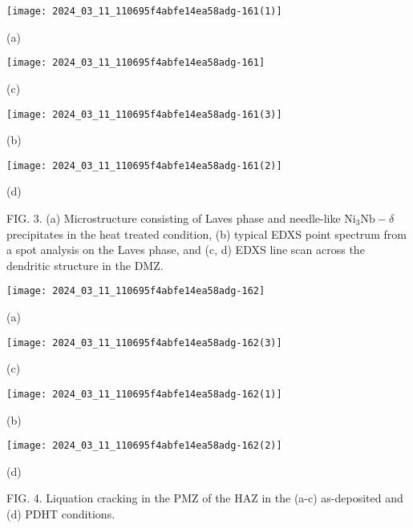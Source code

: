 \documentclass[10pt]{article}
\begin{document}
\begin{center}
\texttt{[image: 2024\_03\_11\_110695f4abfe14ea58adg-161(1)]}
\end{center}

(a)

\begin{center}
\texttt{[image: 2024\_03\_11\_110695f4abfe14ea58adg-161]}
\end{center}

(c)

\begin{center}
\texttt{[image: 2024\_03\_11\_110695f4abfe14ea58adg-161(3)]}
\end{center}

(b)

\begin{center}
\texttt{[image: 2024\_03\_11\_110695f4abfe14ea58adg-161(2)]}
\end{center}

(d)

FIG. 3. (a) Microstructure consisting of Laves phase and needle-like $\mathrm{Ni}_{3} \mathrm{Nb}-\delta$ precipitates in the heat treated condition, (b) typical EDXS point spectrum from a spot analysis on the Laves phase, and (c, d) EDXS line scan across the dendritic structure in the DMZ.

\begin{center}
\texttt{[image: 2024\_03\_11\_110695f4abfe14ea58adg-162]}
\end{center}

(a)

\begin{center}
\texttt{[image: 2024\_03\_11\_110695f4abfe14ea58adg-162(3)]}
\end{center}

(c)

\begin{center}
\texttt{[image: 2024\_03\_11\_110695f4abfe14ea58adg-162(1)]}
\end{center}

(b)

\begin{center}
\texttt{[image: 2024\_03\_11\_110695f4abfe14ea58adg-162(2)]}
\end{center}

(d)

FIG. 4. Liquation cracking in the PMZ of the HAZ in the (a-c) as-deposited and (d) PDHT conditions.
\end{document}
